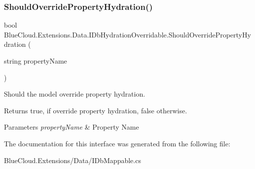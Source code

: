 \subsubsection{\texorpdfstring{Should\+Override\+Property\+Hydration()}{ShouldOverridePropertyHydration()}}
{\footnotesize\ttfamily bool Blue\+Cloud.\+Extensions.\+Data.\+I\+Db\+Hydration\+Overridable.\+Should\+Override\+Property\+Hydration (\begin{DoxyParamCaption}\item[{string}]{property\+Name }\end{DoxyParamCaption})}



Should the model override property hydration. 

\begin{DoxyReturn}{Returns}
{\ttfamily true}, if override property hydration, {\ttfamily false} otherwise.
\end{DoxyReturn}

\begin{DoxyParams}{Parameters}
{\em property\+Name} & Property Name\\
\hline
\end{DoxyParams}


The documentation for this interface was generated from the following file\+:\begin{DoxyCompactItemize}
\item 
Blue\+Cloud.\+Extensions/\+Data/I\+Db\+Mappable.\+cs\end{DoxyCompactItemize}
